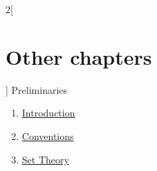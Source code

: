 \begin{multicols}{2}[\section{Other chapters}]
\noindent
Preliminaries
\begin{enumerate}
\item \hyperref[introduction-section-phantom]{Introduction}
\item \hyperref[conventions-section-phantom]{Conventions}
\item \hyperref[sets-section-phantom]{Set Theory}
\end{enumerate}
\end{multicols}
